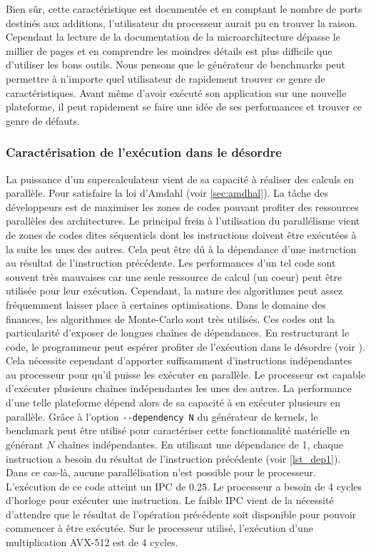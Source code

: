     Bien sûr, cette caractéristique est documentée et en comptant le nombre de ports destinés aux additions, l'utilisateur du processeur aurait pu en trouver la raison. Cependant la lecture de la documentation de la microarchitecture dépasse le millier de pages et en comprendre les moindres détails est plus difficile que d'utiliser les bons outils. Nous pensons que le générateur de benchmarks peut permettre à n'importe quel utilisateur de rapidement trouver ce genre de caractéristiques. Avant même d'avoir exécuté son application sur une nouvelle plateforme, il peut rapidement se faire une idée de ses performances et trouver ce genre de défauts.




    \subsubsection{Caractérisation de l'exécution dans le désordre}\label{sec:kg_out_of_order_dependency}

    La puissance d'un supercalculateur vient de sa capacité à réaliser des calculs en parallèle. Pour satisfaire la loi d'Amdahl (voir \autoref{sec:amdhal}). La tâche des développeurs est de maximiser les zones de codes pouvant profiter des ressources parallèles des architectures. Le principal frein à l'utilisation du parallélisme vient de zones de codes dites séquentiels dont les instructions doivent être exécutées à la suite les unes des autres. Cela peut être dû à la dépendance d'une instruction au résultat de l'instruction précédente. Les performances d'un tel code sont souvent très mauvaises car une seule ressource de calcul (un coeur) peut être utilisée pour leur exécution. Cependant, la nature des algorithmes peut assez fréquemment laisser place à certaines optimisations. Dans le domaine des finances, les algorithmes de Monte-Carlo sont très utilisés. Ces codes ont la particularité d'exposer de longues chaînes de dépendances. En restructurant le code, le programmeur peut espérer profiter de l'exécution dans le désordre (voir ). Cela nécessite cependant d'apporter suffisamment d'instructions indépendantes au processeur pour qu'il puisse les exécuter en parallèle. Le processeur est capable d'exécuter plusieurs chaînes indépendantes les unes des autres. La performance d'une telle plateforme dépend alors de sa capacité à en exécuter plusieurs en parallèle. Grâce à l'option \verb|--dependency N| du générateur de kernels, le benchmark peut être utilisé pour caractériser cette fonctionnalité matérielle en générant $N$ chaînes indépendantes. En utilisant une dépendance de 1, chaque instruction a besoin du résultat de l'instruction précédente (voir \autoref{lst_dep1}). Dans ce cas-là, aucune parallélisation n'est possible pour le processeur. L'exécution de ce code atteint un \gls{IPC} de 0.25. Le processeur a besoin de 4 cycles d'horloge pour exécuter une instruction. Le faible IPC vient de la nécessité d'attendre que le résultat de l'opération précédente soit disponible pour pouvoir commencer à être exécutée. Sur le processeur utilisé, l'exécution d'une multiplication AVX-512 est de 4 cycles.
    
